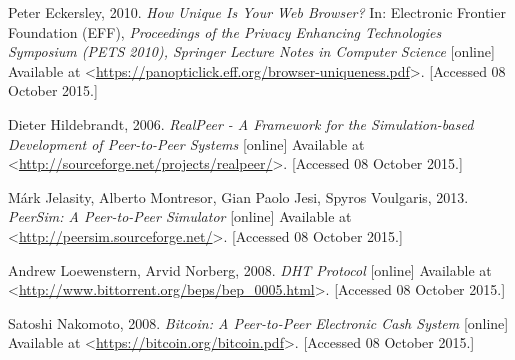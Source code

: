 \documentclass{article}
\begin{document}
Peter Eckersley, 2010.  \emph{How Unique Is Your Web Browser?} In: Electronic Frontier Foundation (EFF), \emph{Proceedings of the Privacy Enhancing Technologies Symposium (PETS 2010), Springer Lecture Notes in Computer Science} [online] Available at <\url{https://panopticlick.eff.org/browser-uniqueness.pdf}>.  [Accessed 08 October 2015.]

Dieter Hildebrandt, 2006.  \emph{RealPeer - A Framework for the Simulation-based Development of Peer-to-Peer Systems} [online] Available at <\url{http://sourceforge.net/projects/realpeer/}>.  [Accessed 08 October 2015.]

Márk Jelasity, Alberto Montresor, Gian Paolo Jesi, Spyros Voulgaris, 2013.  \emph{PeerSim: A Peer-to-Peer Simulator} [online] Available at <\url{http://peersim.sourceforge.net/}>.  [Accessed 08 October 2015.]

Andrew Loewenstern, Arvid Norberg, 2008.  \emph{DHT Protocol} [online] Available at <\url{http://www.bittorrent.org/beps/bep_0005.html}>.  [Accessed 08 October 2015.]

Satoshi Nakomoto, 2008.  \emph{Bitcoin: A Peer-to-Peer Electronic Cash System} [online] Available at <\url{https://bitcoin.org/bitcoin.pdf}>.  [Accessed 08 October 2015.]
\end{document}
